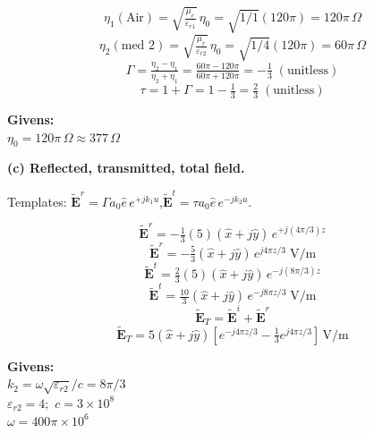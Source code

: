 \documentclass[11pt,letterpaper]{article}
\begin{document}
\begin{minipage}[t]{0.55\linewidth}\vspace{0pt}
\[\eta_1(\text{Air}) = \sqrt{\tfrac{\mu_r}{\varepsilon_{r1}}}\,\eta_0 = \sqrt{1/1}(120\pi) = 120\pi\,\Omega\]
\[\eta_2(\text{med 2}) = \sqrt{\tfrac{\mu_r}{\varepsilon_{r2}}}\,\eta_0 = \sqrt{1/4}(120\pi) = 60\pi\,\Omega\]
\[\Gamma = \tfrac{\eta_2-\eta_1}{\eta_2+\eta_1} = \tfrac{60\pi-120\pi}{60\pi+120\pi} = \boxed{-\tfrac{1}{3}}\;(\text{unitless})\]
\[\tau = 1+\Gamma = 1-\tfrac{1}{3} = \boxed{\tfrac{2}{3}}\;(\text{unitless})\]
\end{minipage}\hfill
\begin{minipage}[t]{0.42\linewidth}\vspace{0pt}
\begin{givens}
\textbf{Givens:}\\
$\eta_0 = 120\pi\,\Omega \approx 377\,\Omega$
\end{givens}
\end{minipage}

\textbf{(c) Reflected, transmitted, total field.}

Templates: $\tilde{\mathbf{E}}^r = \Gamma a_0\hat{e}\,e^{+jk_1u}$,\quad $\tilde{\mathbf{E}}^t = \tau a_0\hat{e}\,e^{-jk_2u}$.

\begin{minipage}[t]{0.55\linewidth}\vspace{0pt}
\[\tilde{\mathbf{E}}^r = -\tfrac{1}{3}(5)(\hat{x}+j\hat{y})\,e^{+j(4\pi/3)z}\]
\[\boxed{\tilde{\mathbf{E}}^r = -\tfrac{5}{3}(\hat{x}+j\hat{y})\,e^{j4\pi z/3}\;\text{V/m}}\]
\[\tilde{\mathbf{E}}^t = \tfrac{2}{3}(5)(\hat{x}+j\hat{y})\,e^{-j(8\pi/3)z}\]
\[\boxed{\tilde{\mathbf{E}}^t = \tfrac{10}{3}(\hat{x}+j\hat{y})\,e^{-j8\pi z/3}\;\text{V/m}}\]
\[\tilde{\mathbf{E}}_T = \tilde{\mathbf{E}}^i + \tilde{\mathbf{E}}^r\]
\[\boxed{\tilde{\mathbf{E}}_T = 5(\hat{x}+j\hat{y})\!\left[e^{-j4\pi z/3} - \tfrac{1}{3}e^{j4\pi z/3}\right]\,\text{V/m}}\]
\end{minipage}\hfill
\begin{minipage}[t]{0.42\linewidth}\vspace{0pt}
\begin{givens}
\textbf{Givens:}\\
$k_2 = \omega\sqrt{\varepsilon_{r2}}/c = 8\pi/3$\\
$\varepsilon_{r2} = 4$;\ $c = 3{\times}10^8$\\
$\omega = 400\pi{\times}10^6$
\end{givens}
\end{minipage}
\end{document}
